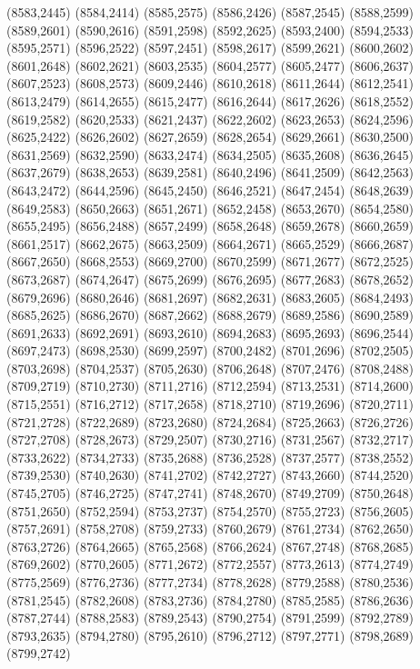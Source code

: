 (8583,2445)
(8584,2414)
(8585,2575)
(8586,2426)
(8587,2545)
(8588,2599)
(8589,2601)
(8590,2616)
(8591,2598)
(8592,2625)
(8593,2400)
(8594,2533)
(8595,2571)
(8596,2522)
(8597,2451)
(8598,2617)
(8599,2621)
(8600,2602)
(8601,2648)
(8602,2621)
(8603,2535)
(8604,2577)
(8605,2477)
(8606,2637)
(8607,2523)
(8608,2573)
(8609,2446)
(8610,2618)
(8611,2644)
(8612,2541)
(8613,2479)
(8614,2655)
(8615,2477)
(8616,2644)
(8617,2626)
(8618,2552)
(8619,2582)
(8620,2533)
(8621,2437)
(8622,2602)
(8623,2653)
(8624,2596)
(8625,2422)
(8626,2602)
(8627,2659)
(8628,2654)
(8629,2661)
(8630,2500)
(8631,2569)
(8632,2590)
(8633,2474)
(8634,2505)
(8635,2608)
(8636,2645)
(8637,2679)
(8638,2653)
(8639,2581)
(8640,2496)
(8641,2509)
(8642,2563)
(8643,2472)
(8644,2596)
(8645,2450)
(8646,2521)
(8647,2454)
(8648,2639)
(8649,2583)
(8650,2663)
(8651,2671)
(8652,2458)
(8653,2670)
(8654,2580)
(8655,2495)
(8656,2488)
(8657,2499)
(8658,2648)
(8659,2678)
(8660,2659)
(8661,2517)
(8662,2675)
(8663,2509)
(8664,2671)
(8665,2529)
(8666,2687)
(8667,2650)
(8668,2553)
(8669,2700)
(8670,2599)
(8671,2677)
(8672,2525)
(8673,2687)
(8674,2647)
(8675,2699)
(8676,2695)
(8677,2683)
(8678,2652)
(8679,2696)
(8680,2646)
(8681,2697)
(8682,2631)
(8683,2605)
(8684,2493)
(8685,2625)
(8686,2670)
(8687,2662)
(8688,2679)
(8689,2586)
(8690,2589)
(8691,2633)
(8692,2691)
(8693,2610)
(8694,2683)
(8695,2693)
(8696,2544)
(8697,2473)
(8698,2530)
(8699,2597)
(8700,2482)
(8701,2696)
(8702,2505)
(8703,2698)
(8704,2537)
(8705,2630)
(8706,2648)
(8707,2476)
(8708,2488)
(8709,2719)
(8710,2730)
(8711,2716)
(8712,2594)
(8713,2531)
(8714,2600)
(8715,2551)
(8716,2712)
(8717,2658)
(8718,2710)
(8719,2696)
(8720,2711)
(8721,2728)
(8722,2689)
(8723,2680)
(8724,2684)
(8725,2663)
(8726,2726)
(8727,2708)
(8728,2673)
(8729,2507)
(8730,2716)
(8731,2567)
(8732,2717)
(8733,2622)
(8734,2733)
(8735,2688)
(8736,2528)
(8737,2577)
(8738,2552)
(8739,2530)
(8740,2630)
(8741,2702)
(8742,2727)
(8743,2660)
(8744,2520)
(8745,2705)
(8746,2725)
(8747,2741)
(8748,2670)
(8749,2709)
(8750,2648)
(8751,2650)
(8752,2594)
(8753,2737)
(8754,2570)
(8755,2723)
(8756,2605)
(8757,2691)
(8758,2708)
(8759,2733)
(8760,2679)
(8761,2734)
(8762,2650)
(8763,2726)
(8764,2665)
(8765,2568)
(8766,2624)
(8767,2748)
(8768,2685)
(8769,2602)
(8770,2605)
(8771,2672)
(8772,2557)
(8773,2613)
(8774,2749)
(8775,2569)
(8776,2736)
(8777,2734)
(8778,2628)
(8779,2588)
(8780,2536)
(8781,2545)
(8782,2608)
(8783,2736)
(8784,2780)
(8785,2585)
(8786,2636)
(8787,2744)
(8788,2583)
(8789,2543)
(8790,2754)
(8791,2599)
(8792,2789)
(8793,2635)
(8794,2780)
(8795,2610)
(8796,2712)
(8797,2771)
(8798,2689)
(8799,2742)

